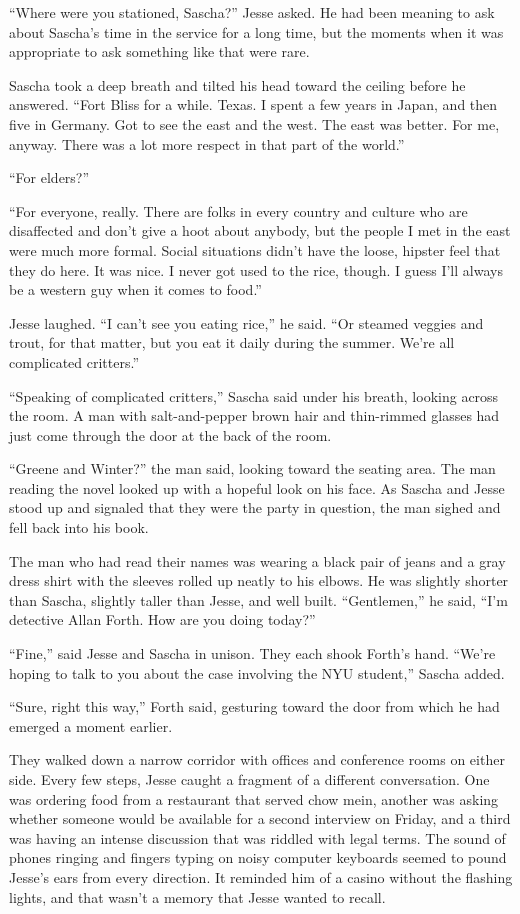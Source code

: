 \documentclass[12pt]{book}
\begin{document}
``Where were you stationed, Sascha?'' Jesse asked.  He had been meaning to ask about Sascha's time in the service for a long time, but the moments when it was appropriate to ask something like that were rare.

Sascha took a deep breath and tilted his head toward the ceiling before he answered.  ``Fort Bliss for a while.  Texas.  I spent a few years in Japan, and then five in Germany.  Got to see the east and the west.  The east was better.  For me, anyway.  There was a lot more respect in that part of the world.''

``For elders?''

``For everyone, really.  There are folks in every country and culture who are disaffected and don't give a hoot about anybody, but the people I met in the east were much more formal.  Social situations didn't have the loose, hipster feel that they do here.  It was nice.  I never got used to the rice, though.  I guess I'll always be a western guy when it comes to food.''

Jesse laughed.  ``I can't see you eating rice,'' he said.  ``Or steamed veggies and trout, for that matter, but you eat it daily during the summer.  We're all complicated critters.''

``Speaking of complicated critters,'' Sascha said under his breath, looking across the room.  A man with salt-and-pepper brown hair and thin-rimmed glasses had just come through the door at the back of the room.

``Greene and Winter?'' the man said, looking toward the seating area.  The man reading the novel looked up with a hopeful look on his face.  As Sascha and Jesse stood up and signaled that they were the party in question, the man sighed and fell back into his book.

The man who had read their names was wearing a black pair of jeans and a gray dress shirt with the sleeves rolled up neatly to his elbows.  He was slightly shorter than Sascha, slightly taller than Jesse, and well built.  ``Gentlemen,'' he said, ``I'm detective Allan Forth.  How are you doing today?''

``Fine,'' said Jesse and Sascha in unison.  They each shook Forth's hand.  ``We're hoping to talk to you about the case involving the NYU student,'' Sascha added.

``Sure, right this way,'' Forth said, gesturing toward the door from which he had emerged a moment earlier.

They walked down a narrow corridor with offices and conference rooms on either side.  Every few steps, Jesse caught a fragment of a different conversation.  One was ordering food from a restaurant that served chow mein, another was asking whether someone would be available for a second interview on Friday, and a third was having an intense discussion that was riddled with legal terms.  The sound of phones ringing and fingers typing on noisy computer keyboards seemed to pound Jesse's ears from every direction.  It reminded him of a casino without the flashing lights, and that wasn't a memory that Jesse wanted to recall.
\end{document}
